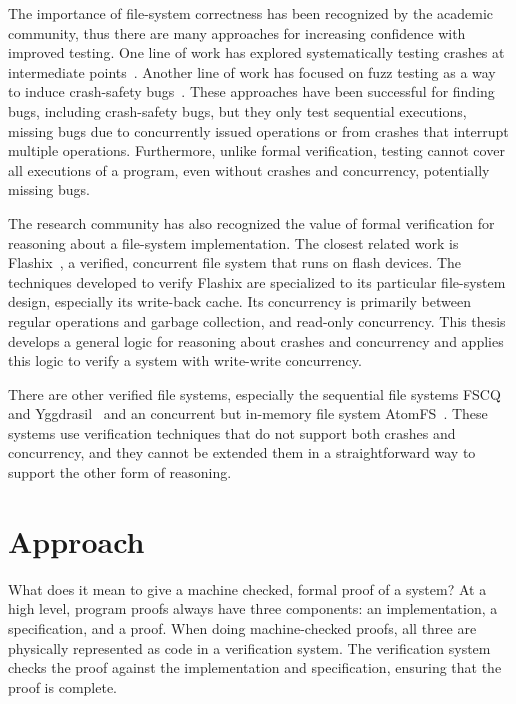 The importance of file-system correctness has been recognized by the academic
community, thus there are many approaches for increasing confidence with
improved testing. One line of work has explored systematically testing crashes
at intermediate points~\cite{mohan:crashmonkey,pillai:appcrash,yang:explode}. Another line of
work has focused on fuzz testing as a way to induce crash-safety
bugs~\cite{xu:janus,kim:hydra}. These approaches have been successful for
finding bugs, including crash-safety bugs, but they only test sequential
executions, missing bugs due to concurrently issued operations or from crashes
that interrupt multiple operations. Furthermore, unlike formal verification, testing cannot
cover all executions of a program, even without crashes and concurrency,
potentially missing bugs.

The research community has also recognized the value of formal verification for
reasoning about a file-system implementation. The closest related work is
Flashix~\cite{bodenmuller:concurrent-flashix}, a verified, concurrent file
system that runs on flash devices. The techniques
developed to verify Flashix are specialized to its particular file-system
design, especially its write-back cache. Its concurrency is primarily between
regular operations and garbage collection, and read-only concurrency. This
thesis develops a general logic for reasoning about crashes and concurrency and
applies this logic to verify a system with write-write concurrency.

There are other verified file systems, especially the sequential file systems
FSCQ~\cite{chen:fscq} and Yggdrasil~\cite{sigurbjarnarson:yggdrasil} and an
concurrent but in-memory file system AtomFS~\cite{zou:atomfs}. These systems use
verification techniques that do not support both crashes and concurrency, and they
cannot be extended them in a straightforward way to support the other form of reasoning.

\section{Approach}
\label{sec:intro:approach}

What does it mean to give a machine checked, formal proof of a system? At a high
level, program proofs always have three components: an implementation, a
specification, and a proof. When doing machine-checked proofs, all three are
physically represented as code in a verification system. The verification system
checks the proof against the implementation and specification, ensuring that the
proof is complete.

